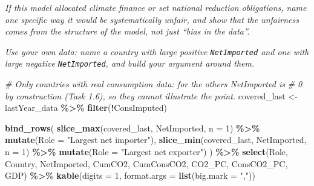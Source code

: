 \documentclass[
]{article}
\newenvironment{Shaded}{\begin{snugshade}}{\end{snugshade}}
\newcommand{\AttributeTok}[1]{\textcolor[rgb]{0.13,0.29,0.53}{#1}}
\newcommand{\CommentTok}[1]{\textcolor[rgb]{0.56,0.35,0.01}{\textit{#1}}}
\newcommand{\DecValTok}[1]{\textcolor[rgb]{0.00,0.00,0.81}{#1}}
\newcommand{\FunctionTok}[1]{\textcolor[rgb]{0.13,0.29,0.53}{\textbf{#1}}}
\newcommand{\NormalTok}[1]{#1}
\newcommand{\OtherTok}[1]{\textcolor[rgb]{0.56,0.35,0.01}{#1}}
\newcommand{\SpecialCharTok}[1]{\textcolor[rgb]{0.81,0.36,0.00}{\textbf{#1}}}
\newcommand{\StringTok}[1]{\textcolor[rgb]{0.31,0.60,0.02}{#1}}
\begin{document}
\emph{If this model allocated climate finance or set national reduction
obligations, name one specific way it would be systematically unfair,
and show that the unfairness comes from the structure of the model, not
just ``bias in the data''.}

\emph{Use your own data: name a country with large positive
\texttt{NetImported} and one with large negative \texttt{NetImported},
and build your argument around them.}

\begin{Shaded}
\begin{Highlighting}[]
\CommentTok{\# Only countries with real consumption data: for the others NetImported is}
\CommentTok{\# 0 by construction (Task 1.6), so they cannot illustrate the point.}
\NormalTok{covered\_last }\OtherTok{\textless{}{-}}\NormalTok{ lastYear\_data }\SpecialCharTok{\%\textgreater{}\%} \FunctionTok{filter}\NormalTok{(}\SpecialCharTok{!}\NormalTok{ConsImputed)}

\FunctionTok{bind\_rows}\NormalTok{(}
  \FunctionTok{slice\_max}\NormalTok{(covered\_last, NetImported, }\AttributeTok{n =} \DecValTok{1}\NormalTok{) }\SpecialCharTok{\%\textgreater{}\%}
    \FunctionTok{mutate}\NormalTok{(}\AttributeTok{Role =} \StringTok{"Largest net importer"}\NormalTok{),}
  \FunctionTok{slice\_min}\NormalTok{(covered\_last, NetImported, }\AttributeTok{n =} \DecValTok{1}\NormalTok{) }\SpecialCharTok{\%\textgreater{}\%}
    \FunctionTok{mutate}\NormalTok{(}\AttributeTok{Role =} \StringTok{"Largest net exporter"}\NormalTok{)}
\NormalTok{) }\SpecialCharTok{\%\textgreater{}\%}
  \FunctionTok{select}\NormalTok{(Role, Country, NetImported, CumCO2, CumConsCO2, CO2\_PC,}
\NormalTok{         ConsCO2\_PC, GDP) }\SpecialCharTok{\%\textgreater{}\%}
  \FunctionTok{kable}\NormalTok{(}\AttributeTok{digits =} \DecValTok{1}\NormalTok{, }\AttributeTok{format.args =} \FunctionTok{list}\NormalTok{(}\AttributeTok{big.mark =} \StringTok{","}\NormalTok{))}
\end{Highlighting}
\end{Shaded}
\end{document}
